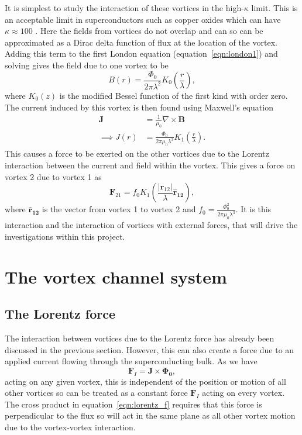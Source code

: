 \documentclass{article}
\numberwithin{equation}{section}
\begin{document}
It is simplest to study the interaction of these vortices in the high-$\kappa$ limit. This is an acceptable limit in superconductors such as copper oxides which can have $\kappa \approx 100$ \cite{Poole2014Superconductivity}. Here the fields from vortices do not overlap and can so can be approximated as a Dirac delta function of flux at the location of the vortex. Adding this term to the first London equation (equation~\ref{eqn:london1}) and solving gives the field due to one vortex to be \cite{Poole2014Superconductivity}
\begin{equation}
    B(r) = \frac{\Phi_0}{2\pi\lambda^2}K_0\left(\frac{r}{\lambda}\right),
\end{equation}
where $K_0(z)$ is the modified Bessel function of the first kind with order zero. The current induced by this vortex is then found using Maxwell's equation
\begin{align}
    \mathbf{J} &= \frac{1}{\mu_0}\nabla\times\mathbf{B} \nonumber \\
    \implies J(r) &= \frac{\Phi_0}{2\pi\mu_0\lambda^3}K_1\left(\frac{r}{\lambda}\right).
\end{align}
This causes a force to be exerted on the other vortices due to the Lorentz interaction between the current and field within the vortex. This gives a force on vortex 2 due to vortex 1 as
\begin{equation}
    \mathbf{F}_{21} = f_0K_1\left(\frac{|\mathbf{r}_{12}|}{\lambda}\mathbf{\hat{r}_{12}}\right), \label{eqn:vortex_force}
\end{equation}
where $\mathbf{\hat{r}_{12}}$ is the vector from vortex 1 to vortex 2 and $f_0 = \frac{\Phi_0^2}{2\pi\mu_0\lambda^3}$. It is this interaction and the interaction of vortices with external forces, that will drive the investigations within this project.

\section{The vortex channel system}
\subsection{The Lorentz force}
The interaction between vortices due to the Lorentz force has already been discussed in the previous section. However, this can also create a force due to an applied current flowing through the superconducting bulk. As we have
\begin{equation}
    \mathbf{F}_I = \mathbf{J} \times \mathbf{\Phi_0}, \label{eqn:lorentz_f}
\end{equation}
acting on any given vortex, this is independent of the position or motion of all other vortices so can be treated as a constant force $\mathbf{F}_I$ acting on every vortex. The cross product in equation~\ref{eqn:lorentz_f} requires that this force is perpendicular to the flux so will act in the same plane as all other vortex motion due to the vortex-vortex interaction.
\end{document}
